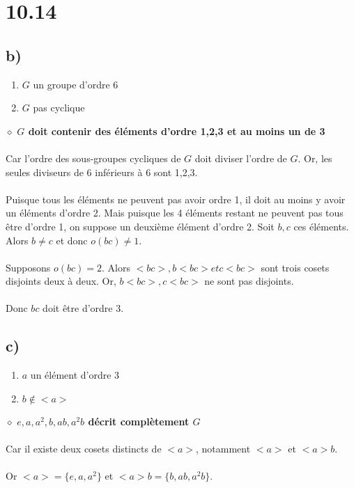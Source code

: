 \documentclass[a4paper,10pt]{article}
\begin{document}
\section*{10.14}
\subsection*{b)}
\begin{enumerate}
 \item $G$ un groupe d'ordre 6
 \item $G$ pas cyclique
\end{enumerate}
$\diamond$ \textbf{$G$ doit contenir des éléments d'ordre 1,2,3 et au moins un de 3}
\\
\\
Car l'ordre des sous-groupes cycliques de $G$ doit diviser l'ordre de $G$. Or, les seules diviseurs de 6 inférieurs
à 6 sont 1,2,3. 
\\
\\
Puisque tous les éléments ne peuvent pas avoir ordre 1, il doit au moins y avoir un éléments d'ordre 2. Mais puisque les 4 éléments restant ne
peuvent pas tous être d'ordre 1, on suppose un deuxième élément d'ordre 2. Soit $b,c$ ces éléments. Alors $b \not = c$ et donc $o(bc) \not = 1$.
\\
\\
Supposons $o(bc) = 2$. Alors $<bc>, b<bc> et c<bc>$ sont trois cosets disjoints deux à deux. Or, $b<bc>, c<bc>$ ne sont pas disjoints. 
\\
\\
Donc $bc$ doit être d'ordre 3. 
\subsection*{c)}
\begin{enumerate}
 \item $a$ un élément d'ordre 3
 \item $b \not \in <a>$
\end{enumerate}
$\diamond$ \textbf{$e,a,a^2,b,ab,a^2b$ décrit complètement $G$}
\\
\\
Car il existe deux cosets distincts de $<a>$, notamment $<a>$ et $<a>b$.
\\
\\
Or $<a> = \{e,a,a^2\}$ et $<a>b = \{b,ab,a^2 b\}$.
\end{document}
